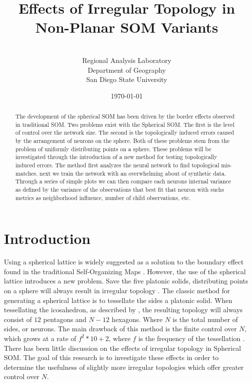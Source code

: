 \documentclass[11pt]{article}
\title{Effects of Irregular Topology in Non-Planar SOM Variants}
\author{\sc{Charles R. Schmidt}\\Regional Analysis Laboratory\\Department of Geography\\San Diego State University}
\date{\today} %
\begin{document}
\maketitle
\begin{abstract}
The development of the spherical SOM has been driven by the border effects
observed in traditional SOM.  Two problems exist with the Spherical SOM. The
first is the level of control over the network size. The second is the
topologically induced errors caused by the arrangement of neurons on the sphere.
Both of these problems stem from the problem of uniformly distributing points on
a sphere. These problems will be investigated through the introduction of a new
method for testing topologically induced errors. The method first analyzes  the
neural network to find topological mis-matches, next we train the network with
an overwhelming about of synthetic data.  Through a series of simple plots we
can then compare each neurons internal variance as defined by the variance of
the observations that best fit that neuron with suchs metrics as neighborhood
influence, number of child observations, etc.
\end{abstract}



\section{Introduction}
Using a spherical lattice is widely suggested as a solution to the boundary
effect found in the traditional Self-Organizing Maps \citep{ritter99, boudjemai2003,
sangole03, wu2006, Nishio:2006fk}.  However, the use of the spherical lattice
introduces a new problem.  Save the five platonic solids, distributing points on
a sphere will always result in irregular topology \citep{ritter99}.  The classic
method for generating a spherical lattice is to tessellate the sides a platonic
solid.  When tessellating the icosahedron, as described by \cite{wu2006}, the
resulting topology will always consist of \(12\) pentagons and \(N-12\) hexagons.
Where \(N\) is the total number of sides, or neurons.  The main drawback of this
method is the finite control over \(N\), which grows at a rate of \(f^2*10+2\),
where \(f\) is the frequency of the tessellation \citep{wu2006}.  There has been
little discussion on the effects of irregular topology in Spherical SOM. The goal of
this research is to investigate these effects in order to determine the usefulness of
slightly more irregular topologies which offer greater control over \(N\).
\end{document}
